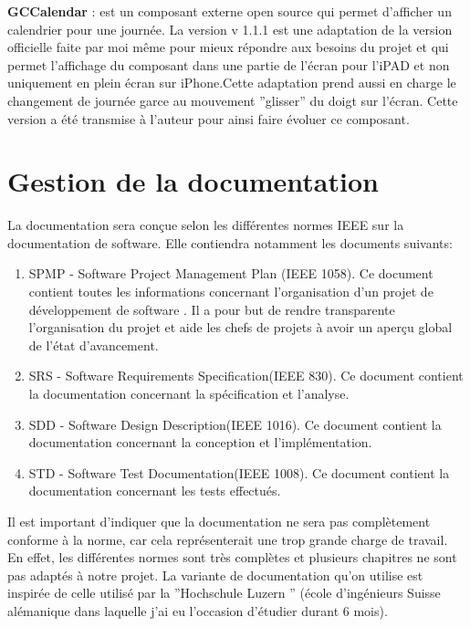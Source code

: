 	 
\textbf{GCCalendar} : est un composant externe open source qui permet d'afficher un calendrier pour une journée.\cite{gcCalendar} La version  v 1.1.1 est une adaptation de la version officielle faite par moi même pour mieux répondre aux besoins du projet et qui permet l'affichage du composant dans une partie de l'écran pour l'iPAD et non uniquement en plein écran sur iPhone.Cette adaptation prend aussi en charge le changement de journée garce au mouvement ''glisser'' du doigt sur l'écran. Cette version a été transmise à l'auteur pour ainsi faire évoluer ce composant.

\section{Gestion de la documentation}
 La documentation sera conçue selon les différentes normes IEEE sur la documentation de software. Elle contiendra notamment les documents suivants:

\begin{enumerate}
	\item \gls{SPMP} - Software Project Management Plan (IEEE 1058).  Ce document contient toutes les informations concernant l'organisation d'un projet de développement de software . Il a pour but de rendre transparente l'organisation du projet et aide les chefs de projets à avoir un aperçu global de l'état d'avancement.
	\item \gls{SRS} - Software Requirements Specification(IEEE 830). Ce document contient la documentation concernant la spécification et l'analyse.
	\item \gls{SDD} - Software Design Description(IEEE 1016). Ce document contient la documentation concernant la conception  et l'implémentation.
	\item \gls{STD} - Software Test Documentation(IEEE 1008). Ce document contient la documentation concernant les tests effectués.
\end{enumerate}	

Il est important d'indiquer que la documentation ne sera pas complètement conforme à la norme, car cela représenterait une trop grande charge de travail. En effet, les différentes normes sont très complètes et plusieurs chapitres ne sont pas adaptés à notre projet. La variante de documentation qu'on utilise est inspirée de celle utilisé par la ''Hochschule Luzern '' (école d'ingénieurs Suisse alémanique dans laquelle j'ai eu l'occasion d'étudier durant 6 mois).

